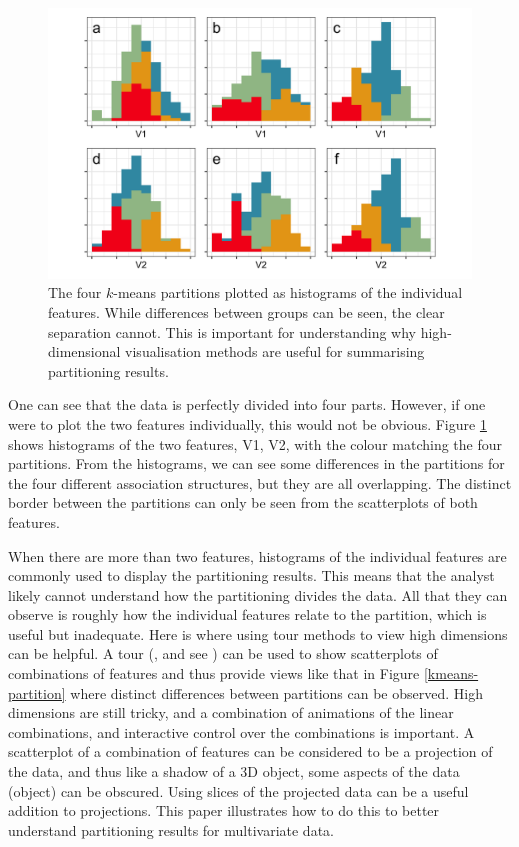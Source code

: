 \documentclass[article]{ajs}
\begin{document}
\begin{figure}[ht]
\centerline{\includegraphics[width=1\textwidth]{images/intro2.png}}
\caption{The four $k$-means partitions plotted as histograms of the individual features. While differences between groups can be seen, the clear separation cannot. This is important for understanding why high-dimensional visualisation methods are useful for summarising partitioning results.}
\label{kmeans-histogram}
\end{figure}

One can see that the data is perfectly divided into four parts. However, if one were to plot the two features individually, this would not be obvious. Figure \ref{kmeans-histogram} shows histograms of the two features, V1, V2, with the colour matching the four partitions. From the histograms, we can see some differences in the partitions for the four different association structures, but they are all overlapping. The distinct border between the partitions can only be seen from the scatterplots of both features. 

When there are more than two features, histograms of the individual features are commonly used to display the partitioning results. This means that the analyst likely cannot understand how the partitioning divides the data. All that they can observe is roughly how the individual features relate to the partition, which is useful but inadequate. Here is where using tour methods to view high dimensions can be helpful. A tour (\cite{Asimov1985-xr}, and see \cite{lee2022}) can be used to show scatterplots of combinations of features and thus provide views like that in Figure \ref{kmeans-partition} where distinct differences between partitions can be observed. High dimensions are still tricky, and a combination of animations of the linear combinations, and interactive control \citep{cook_manual_1997, laa2023new} over the combinations is important. A scatterplot of a combination of features can be considered to be a projection of the data, and thus like a shadow of a 3D object, some aspects of the data (object) can be obscured. Using slices of the projected data \citep{Laa2020} can be a useful addition to projections. This paper illustrates how to do this to better understand partitioning results for multivariate data.
\end{document}
